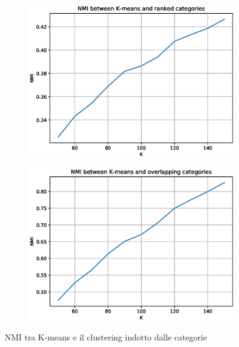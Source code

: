 \documentclass[
	11pt, %
	a4paper, %
	oneside, %
	headinclude,footinclude, %
	BCOR5mm, %
]{scrartcl}
\begin{document}
		\begin{figure}[!htbp]
			\hspace{-1cm}
			\begin{subfigure}{.5\textwidth}
				\centering
				\includegraphics[scale=.5]{Figures/NMI-kmeans-ranked-categories.eps}
			\end{subfigure}
			\hspace{0.5cm}
			\begin{subfigure}{.5\textwidth}
				\centering
				\includegraphics[scale=.5]{Figures/NMI-kmeans-overlapping-categories.eps}
			\end{subfigure}
			\caption{NMI tra K-means e il clustering indotto dalle categorie}
			\label{fig:NMI-kmeans-categories}
		\end{figure}
\end{document}
